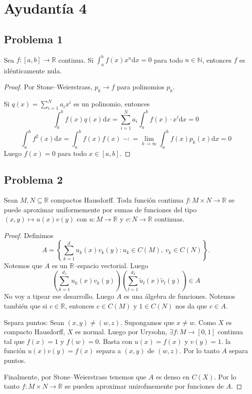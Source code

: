 \documentclass{article}
\theoremstyle{definition}
\theoremstyle{remark}
\numberwithin{equation}{section}
\newcommand{\N}{\mathbb{N}}
\newcommand{\R}{\mathbb{R}}
\renewcommand{\d}{\mathrm{d}}
\newcommand{\oo}{\infty}
\renewcommand{\tilde}{\widetilde}
\newcommand{\br}[1]{\left( #1 \right)}
\newcommand{\set}[1]{\left\{ #1 \right\}}
\begin{document}
\newpage
\section{Ayudantía 4}
\subsection{Problema 1}

Sea $f \colon [a,b] \to \R$ continua. Si $\int_a^b f(x) x^n \d x = 0$ para todo $n \in \N$, entonces $f$ es idénticamente nula.
\begin{proof}
  Por Stone--Weierstrass, $p_k \to f$ para polinomios $p_k$.

  Si $q(x) = \sum_{i=1}^N a_i x^i$ es un polinomio, entonces
  \[\int_a^b f(x) q(x) \d x = \sum_{i=1}^N a_i \int_a^b f(x) \cdot x^i \d x = 0\]
  \[\int_a^b f^2(x) \d x
  = \int_a^b f(x) f(x) \dashcolon= \lim_{k\to\oo} \int_a^b f(x) p_k(x) \d x = 0\]
  Luego $f(x) = 0$ para todo $x \in [a,b]$.
\end{proof}

\newpage
\subsection{Problema 2}

Sean $M,N \subseteq \R$ compactos Hausdorff. Toda función continua $f \colon M \times N \to \R$ se puede aproximar uniformemente por sumas de funciones del tipo $(x,y) \mapsto u(x)v(y)$ con $u \colon M \to \R$ y $v \colon N \to \R$ continuas.

\begin{proof}
  Definimos
  \[A = \set{\sum_{k=1}^d u_k(x) v_k(y) \colon u_k \in C(M), \ v_k \in C(N)}.\]
  Notemos que $A$ es un $\R$--espacio vectorial. Luego
  \[\br{\sum_{k=1}^{d_1} u_k(x)v_k(y)}\br{\sum_{l=1}^{d_2} \tilde u_l(x) \tilde v_l(y)} \in A\]
  No voy a tipear ese desarrollo.
  Luego $A$ es una álgebra de funciones. Notemos también que si $c \in \R$, entonces $c \in C(M)$ y $1 \in C(N)$ nos da que $c \in A$.

  Separa puntos:
  Sean $(x,y) \neq (w,z)$. Supongamos que $x \neq w$. Como $X$ es compacto Hausdorff, $X$ es normal. Luego por Urysohn, $\exists f \colon M \to [0,1]$ continua tal que $f(x) = 1$ y $f(w) = 0$. Basta con $u(x) = f(x)$ y $v(y) = 1$. la función $u(x)v(y) = f(x)$ separa a $(x,y)$ de $(w,z)$. Por lo tanto $A$ separa puntos.

  Finalmente, por Stone--Weierstrass tenemos que $A$ es denso en $C(X)$. Por lo tanto $f \colon M \times N \to \R$ se pueden aproximar unirofmemente por funciones de $A$.
\end{proof}
\end{document}
